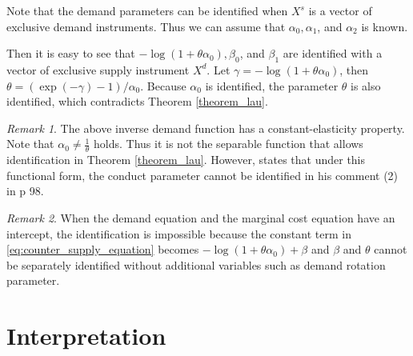 \documentclass[11pt, a4paper]{article}
\theoremstyle{remark}
\newtheorem{remark}{Remark}
\begin{document}
Note that the demand parameters can be identified when $X^s$ is a vector of exclusive demand instruments.
Thus we can assume that $\alpha_0, \alpha_1$, and $\alpha_2$ is known.  

Then it is easy to see that $- \log(1 + \theta\alpha_0), \beta_0$, and $\beta_1$ are identified with a vector of exclusive supply instrument $X^d$.
Let $\gamma = - \log(1 + \theta\alpha_0)$, then $\theta = (\exp(-\gamma) - 1)/\alpha_0$.
Because $\alpha_0$ is identified, the parameter $\theta$ is also identified, which contradicts Theorem \ref{theorem_lau}.
\begin{remark}
    The above inverse demand function has a constant-elasticity property. 
    Note that $\alpha_0 \ne \frac{1}{\theta}$ holds.
    Thus it is not the separable function that allows identification in Theorem \ref{theorem_lau}.
    However, \citet{lau1982identifying} states that under this functional form, the conduct parameter cannot be identified in his comment (2) in p 98.
\end{remark}

\begin{remark}
    When the demand equation and the marginal cost equation have an intercept, the identification is impossible because the constant term in \eqref{eq:counter_supply_equation} becomes $-\log(1+\theta \alpha_0) + \beta$ and $\beta$ and $\theta$ cannot be separately identified without additional variables such as demand rotation parameter.
\end{remark}



\section{Interpretation}
\end{document}
